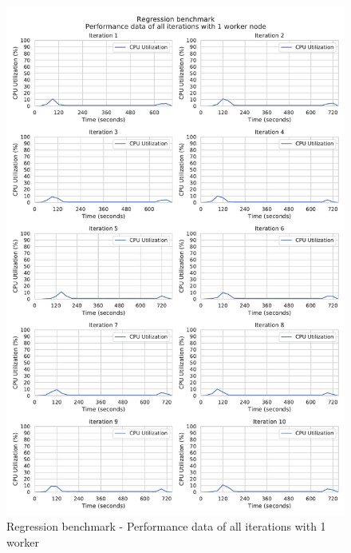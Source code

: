 \begin{figure}[h]
\centering
\includegraphics[scale=0.5]{images/appendix/evaluation_data/regression_benchmark/regression_1_worker_cpu_performance}
\caption{Regression benchmark - Performance data of all iterations with 1 worker}
\label{fig:appendix_eval_regression_static1}
\end{figure}

